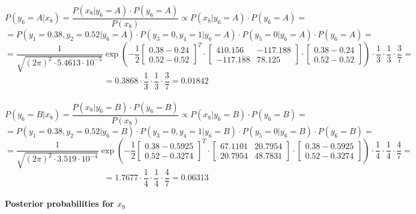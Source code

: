 \documentclass{article}
\begin{document}
\[ P(y_6=A|x_8) = \frac{P(x_8|y_6=A) \cdot P(y_6=A)}{P(x_8)} \propto P(x_8|y_6=A) \cdot P(y_6=A) = \]
\[ = P(y_1=0.38,y_2=0.52|y_6=A) \cdot P(y_3=0,y_4=1|y_6=A) \cdot P(y_5=0|y_6=A) \cdot P(y_6=A) = \]
\[ = \frac{1}{\sqrt{(2\pi)^2 \cdot 5.4613 \cdot 10^{-5}}} \exp \left( -\frac{1}{2} \left[ \begin{matrix} 0.38 - 0.24 \\ 0.52 - 0.52 \end{matrix} \right]^T \cdot \begin{bmatrix} 410.156 & -117.188 \\ -117.188 & 78.125 \end{bmatrix} \cdot \left[ \begin{matrix} 0.38 - 0.24 \\ 0.52 - 0.52 \end{matrix} \right] \right) \cdot \frac{1}{3} \cdot \frac{1}{3} \cdot \frac{3}{7} = \]
\[ = 0.3868 \cdot \frac{1}{3} \cdot \frac{1}{3} \cdot \frac{3}{7} = 0.01842 \]

\paragraph{}

\[ P(y_6=B|x_8) = \frac{P(x_8|y_6=B) \cdot P(y_6=B)}{P(x_8)} \propto P(x_8|y_6=B) \cdot P(y_6=B) = \]
\[ = P(y_1=0.38,y_2=0.52|y_6=B) \cdot P(y_3=0,y_4=1|y_6=B) \cdot P(y_5=0|y_6=B) \cdot P(y_6=B) = \]
\[ = \frac{1}{\sqrt{(2\pi)^2 \cdot 3.519 \cdot 10^{-4}}} \exp \left( -\frac{1}{2} \left[ \begin{matrix} 0.38 - 0.5925 \\ 0.52 - 0.3274 \end{matrix} \right]^T \cdot \begin{bmatrix} 67.1101 & 20.7954 \\ 20.7954 & 48.7831 \end{bmatrix} \cdot \left[ \begin{matrix} 0.38 - 0.5925 \\ 0.52 - 0.3274 \end{matrix} \right] \right) \cdot \frac{1}{4} \cdot \frac{1}{4} \cdot \frac{4}{7} = \]
\[ = 1.7677 \cdot \frac{1}{4} \cdot \frac{1}{4} \cdot \frac{4}{7} = 0.06313 \]

\paragraph{Posterior probabilities for $x_9$}
\paragraph{}
\end{document}
